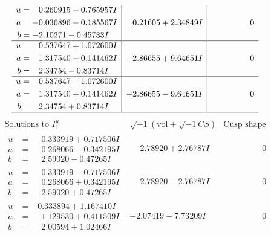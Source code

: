 \documentclass[1p]{elsarticle_modified}
\theoremstyle{definition}
\newcommand{\I}{\sqrt{-1}}
\begin{document}
$$\begin{array}{c|c|c}
\begin{aligned}
u &= \phantom{-}0.260915 - 0.765957 I \\
a &= -0.036896 - 0.185567 I \\
b &= -2.10271 - 0.45733 I\end{aligned}
 & \phantom{-}0.21605 + 2.34849 I & \phantom{-0.000000 } 0 \\ \hline\begin{aligned}
u &= \phantom{-}0.537647 + 1.072600 I \\
a &= \phantom{-}1.317540 - 0.141462 I \\
b &= \phantom{-}2.34754 - 0.83714 I\end{aligned}
 & -2.86655 + 9.64651 I & \phantom{-0.000000 } 0 \\ \hline\begin{aligned}
u &= \phantom{-}0.537647 - 1.072600 I \\
a &= \phantom{-}1.317540 + 0.141462 I \\
b &= \phantom{-}2.34754 + 0.83714 I\end{aligned}
 & -2.86655 - 9.64651 I & \phantom{-0.000000 } 0\\
 \hline 
 \end{array}$$\newpage$$\begin{array}{c|c|c}  
\text{Solutions to }I^u_{1}& \I (\text{vol} + \sqrt{-1}CS) & \text{Cusp shape}\\
 \hline 
\begin{aligned}
u &= \phantom{-}0.333919 + 0.717506 I \\
a &= \phantom{-}0.268066 - 0.342195 I \\
b &= \phantom{-}2.59020 - 0.47265 I\end{aligned}
 & \phantom{-}2.78920 + 2.76787 I & \phantom{-0.000000 } 0 \\ \hline\begin{aligned}
u &= \phantom{-}0.333919 - 0.717506 I \\
a &= \phantom{-}0.268066 + 0.342195 I \\
b &= \phantom{-}2.59020 + 0.47265 I\end{aligned}
 & \phantom{-}2.78920 - 2.76787 I & \phantom{-0.000000 } 0 \\ \hline\begin{aligned}
u &= -0.333894 + 1.167410 I \\
a &= \phantom{-}1.129530 + 0.411509 I \\
b &= \phantom{-}2.00594 + 1.02466 I\end{aligned}
 & -2.07419 - 7.73209 I & \phantom{-0.000000 } 0 \\ \hline\begin{aligned}

\end{aligned}
\end{array}$$
\end{document}
